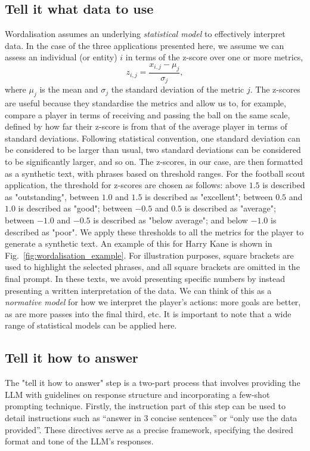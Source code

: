 \documentclass{article}
\begin{document}
\subsection{Tell it what data to use}\label{sec:tell_it_what_data_to_use}
Wordalisation assumes an underlying {\it statistical model} to effectively interpret data. In the case of the three applications presented here, we assume we can assess an individual (or entity) $i$ in terms of the z-score over one or more metrics, 
\[ z_{i,j} = \frac{x_{i,j} - \mu_j}{\sigma_j}, \]
where $\mu_j$ is the mean and $\sigma_j$ the standard deviation of the metric $j$. The z-scores are useful because they standardise the metrics and allow us to, for example, compare a player in terms of receiving and passing the ball on the same scale, defined by how far their z-score is from that of the average player in terms of standard deviations. Following statistical convention, one standard deviation can be considered to be larger than usual, two standard deviations can be considered to be significantly larger, and so on.  
The z-scores, in our case, are then formatted as a synthetic text, with phrases based on threshold ranges. For the football scout application, the threshold for z-scores are chosen as follows: above $1.5$ is described as "outstanding", between $1.0$ and $1.5$ is described as "excellent"; between $0.5$ and $1.0$ is described as "good"; between $-0.5$ and $0.5$ is described as "average"; between $-1.0$ and $-0.5$ is described as "below average"; and below $-1.0$ is described as "poor". We apply these thresholds to all the metrics for the player to generate a synthetic text. An example of this for Harry Kane is shown in Fig.~\ref{fig:wordalisation_example}. For illustration purposes, square brackets are used to highlight the selected phrases, and all square brackets are omitted in the final prompt. In these texts, we avoid presenting specific numbers by instead presenting a written interpretation of the data. We can think of this as a {\it normative model} for how we interpret the player's actions: more goals are better, as are more passes into the final third, etc. 
It is important to note that a wide range of statistical models can be applied here.

\subsection{Tell it how to answer}
The "tell it how to answer" step is a two-part process that involves providing the LLM with guidelines on response structure and incorporating a few-shot prompting technique. Firstly, the instruction part of this step can be used to detail instructions such as “answer in $3$ concise sentences” or “only use the data provided”. These directives serve as a precise framework, specifying the desired format and tone of the LLM’s responses.
\end{document}
